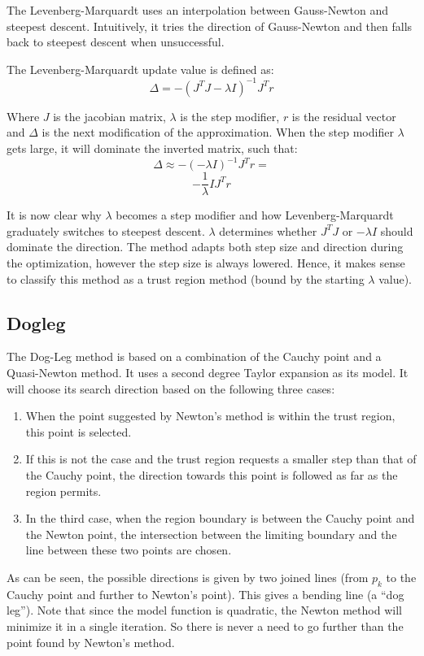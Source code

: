\documentclass[10pt,oneside,a4paper,final,english]{memoir}
\begin{document}
The Levenberg-Marquardt uses an interpolation between Gauss-Newton and
steepest descent. Intuitively, it tries the direction of Gauss-Newton
and then falls back to steepest descent when unsuccessful.

The Levenberg-Marquardt update value is defined as:
\[ \Delta = - (J^TJ - \lambda I)^{-1} J^T r\]

Where $J$ is the jacobian matrix, $\lambda$ is the step modifier,
$r$ is the residual vector and $\Delta$ is the next modification of
the approximation.
When the step modifier $\lambda$ gets large, it will dominate the
inverted matrix, such that:
\[ \Delta \approx - (-\lambda I)^{-1} J^T r = \]
\[ - \frac{1}{\lambda}I J^T r \]


It is now clear why $\lambda$ becomes a step modifier and how
Levenberg-Marquardt graduately switches to steepest descent.
$\lambda$ determines whether $J^TJ$ or $-\lambda I$ should dominate
the direction. The method adapts both step size and direction during
the optimization, however the step size is always lowered. Hence, it
makes sense to classify this method as a trust region method (bound by
the starting $\lambda$ value).

\subsection{Dogleg}
The Dog-Leg method is based on a combination of the Cauchy point and a
Quasi-Newton method. It uses a second degree Taylor expansion as its
model. It will choose its search direction based on the following
three cases:
\begin{enumerate}
\item When the point suggested by Newton's method is within the trust
  region, this point is selected.
\item If this is not the case and the trust region requests a smaller
  step than that of the Cauchy point, the direction towards this point
  is followed as far as the region permits.
\item In the third case, when the region boundary is between the
  Cauchy point and the Newton point, the intersection between the
  limiting boundary and the line between these two points are chosen.
\end{enumerate}

As can be seen, the possible directions is given by two joined lines
(from $p_k$ to the Cauchy point and further to Newton's point). This
gives a bending line (a ``dog leg''). Note that since the model
function is quadratic, the Newton method will minimize it in a single
iteration. So there is never a need to go further than the point found
by Newton's method.
\end{document}
